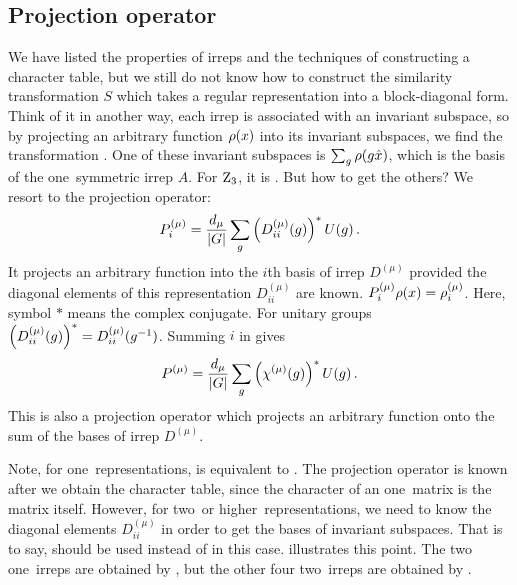 \subsection{Projection operator}
We have listed the properties of irreps and the
techniques of constructing a character table, but we still do not know how to
construct the similarity transformation $S$ which takes a regular representation into a
block-diagonal form. Think of it in another way,
each irrep is associated with an invariant subspace, so by
projecting an arbitrary function $\rho(x)$ into its invariant subspaces, we
find the transformation .
One of these invariant subspaces is $\sum_g \rho(g\hat{x})$, which is the basis of
the one\dmn\ symmetric irrep $A$. For $\textrm{Z}_{3}$, it is .
But how to get the others? We resort to the projection operator:
\begin{equation}
  \label{eq:projecIrre}
  P^{(\mu)}_{i} = \frac{d_\mu}{|G|}\sum_g \left(D^{(\mu)}_{ii} (g)\right)^* U(g)
  \,.
\end{equation}
It projects an arbitrary function into the $i$th basis of irrep
$D^{(\mu)}$ provided the diagonal elements of this representation
$D^{(\mu)}_{ii}$ are known. $ P^{(\mu)}_{i} \rho(x) = \rho^{(\mu)}_i$.
Here, symbol $*$ means the complex conjugate. For unitary groups
$\left(D^{(\mu)}_{ii} (g)\right)^* = D^{(\mu)}_{ii} (g^{-1})$.
Summing $i$ in  gives
\begin{equation}
  \label{eq:projectSum}
  P^{(\mu)} = \frac{d_\mu}{|G|}\sum_g \left(\chi^{(\mu)}(g)\right)^*U(g)
  \,.
\end{equation}
This is also a projection operator which projects an arbitrary function onto
the sum of the bases of irrep $D^{(\mu)}$.

Note, for one\dmn\ representations, 
is equivalent to . The projection operator is
known after we obtain
the character table, since the character of an one\dmn\ matrix is the matrix itself.
However, for two\dmn\ or higher\dmn\ representations, we need to know the
diagonal elements $D^{(\mu)}_{ii}$ in order to get the bases of invariant subspaces. That is to say,
 should be used instead of  in this case.
 illustrates this point. The two one\dmn\ irreps are obtained
by , but the other four two\dmn\ irreps are obtained by
.

